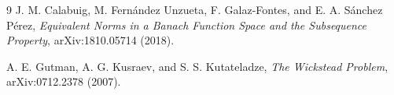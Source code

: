 \documentclass[11pt]{article}
\begin{document}
\begin{thebibliography}{9}
J. M. Calabuig, M. Fern\'andez Unzueta, F. Galaz-Fontes, and
E. A. S\'anchez P\'erez,
\emph{Equivalent Norms in a Banach Function Space and the Subsequence
Property}, arXiv:1810.05714 (2018).

A. E. Gutman, A. G. Kusraev, and S. S. Kutateladze,
\emph{The Wickstead Problem}, arXiv:0712.2378 (2007).
\end{thebibliography}
\end{document}

